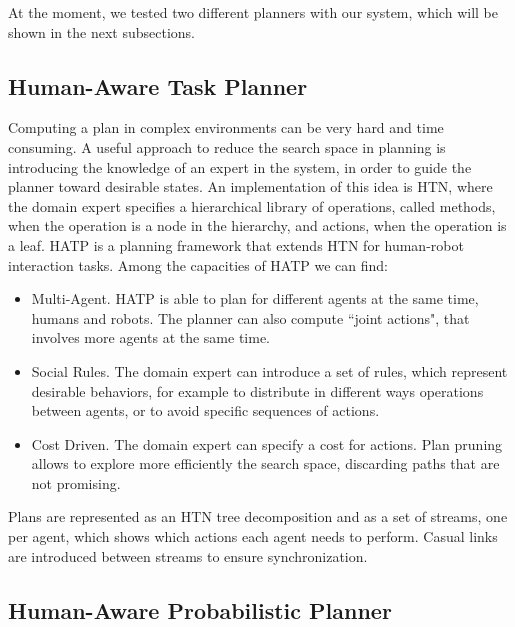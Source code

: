 At the moment, we tested two different planners with our system, which will be shown in the next subsections.


\subsection{Human-Aware Task Planner}
\label{subsec:plan_management-hatp}
Computing a plan in complex environments can be very hard and time consuming. A useful approach to reduce the search space in planning is introducing the knowledge of an expert in the system, in order to guide the planner toward desirable states. An implementation of this idea is HTN, where the domain expert specifies a hierarchical library of operations, called methods, when the operation is a node in the hierarchy, and actions, when the operation is a leaf. HATP is a planning framework that extends HTN for human-robot interaction tasks. Among the capacities of HATP we can find:
\begin{itemize}
\item Multi-Agent. HATP is able to plan for different agents at the same time, humans and robots. The planner can also compute ``joint actions", that involves more agents at the same time.
\item Social Rules. The domain expert can introduce a set of rules, which represent desirable behaviors, for example to distribute in different ways operations between agents, or to avoid specific sequences of actions.
\item Cost Driven. The domain expert can specify a cost for actions. Plan pruning allows to explore more efficiently the search space, discarding paths that are not promising.
\end{itemize} 

Plans are represented as an HTN tree decomposition and as a set of streams, one per agent, which shows which actions each agent needs to perform. Casual links are introduced between streams to ensure synchronization.

\subsection{Human-Aware Probabilistic Planner}
\label{subsec:plan_management-happ}

